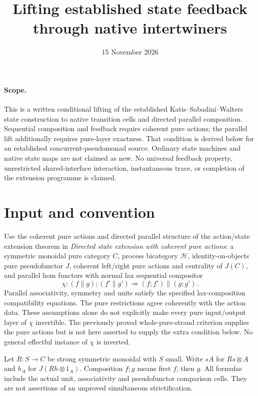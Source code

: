 \documentclass{article}
\title{Lifting established state feedback through native intertwiners}
\date{15 November 2026}
\begin{document}
\maketitle
\paragraph{Scope.} This is a written conditional lifting of the established Katis--Sabadini--Walters state construction to native transition cells and directed parallel composition. Sequential composition and feedback require coherent pure actions; the parallel lift additionally requires pure-layer exactness. That condition is derived below for an established concurrent-pseudomonad source. Ordinary state machines and native state maps are not claimed as new. No universal feedback property, unrestricted shared-interface interaction, instantaneous trace, or completion of the extension programme is claimed.

\section{Input and convention}
Use the coherent pure actions and directed parallel structure of the action/state extension theorem in \emph{Directed state extension with coherent pure actions}: a symmetric monoidal pure category $C$, process bicategory $\mathcal H$, identity-on-objects pure pseudofunctor $J$, coherent left/right pure actions and centrality of $J(C)$, and parallel hom functors with normal lax sequential compositor
\[
\chi:(f\parallel g);(f'\parallel g')\Rightarrow(f;f')\parallel(g;g').
\]
Parallel associativity, symmetry and units satisfy the specified lax-composition compatibility equations. The pure restrictions agree coherently with the action data. These assumptions alone do not explicitly make every pure input/output layer of $\chi$ invertible. The previously proved whole-pure-strand criterion supplies the pure actions but is not here asserted to supply the extra condition below. No general effectful instance of $\chi$ is inverted.

Let $R:S\to C$ be strong symmetric monoidal with $S$ small. Write $sA$ for $Rs\otimes A$ and $h_A$ for $J(Rh\otimes1_A)$. Composition $f;g$ means first $f$, then $g$. All formulas include the actual unit, associativity and pseudofunctor comparison cells. They are not assertions of an unproved simultaneous strictification.
\end{document}
